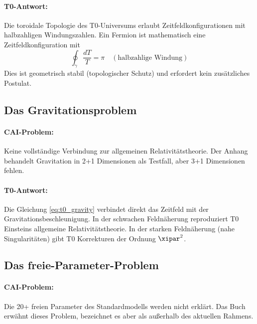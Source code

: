 \paragraph{T0-Antwort:} Die toroidale Topologie des T0-Universums erlaubt
Zeitfeldkonfigurationen mit halbzahligen Windungszahlen. Ein Fermion ist
mathematisch eine Zeitfeldkonfiguration mit
\begin{equation}
    \oint_\gamma \frac{d T}{T} = \pi \quad (\text{halbzahlige Windung})
    \label{eq:fermion_winding}
\end{equation}
Dies ist geometrisch stabil (topologischer Schutz) und erfordert kein
zusätzliches Postulat.

\subsection{Das Gravitationsproblem}

\paragraph{CAI-Problem:} Keine vollständige Verbindung zur allgemeinen
Relativitätstheorie. Der Anhang behandelt Gravitation in 2+1 Dimensionen
als Testfall, aber 3+1 Dimensionen fehlen.

\paragraph{T0-Antwort:} Die Gleichung \eqref{eq:t0_gravity} verbindet direkt
das Zeitfeld mit der Gravitationsbeschleunigung. In der schwachen Feldnäherung
reproduziert T0 Einsteins allgemeine Relativitätstheorie. In der starken
Feldnäherung (nahe Singularitäten) gibt T0 Korrekturen der Ordnung $\xipar^2$.

\subsection{Das freie-Parameter-Problem}

\paragraph{CAI-Problem:} Die 20+ freien Parameter des Standardmodells werden
nicht erklärt. Das Buch erwähnt dieses Problem, bezeichnet es aber als
außerhalb des aktuellen Rahmens.

